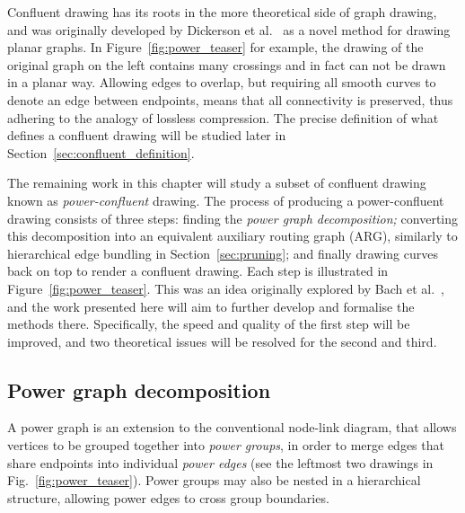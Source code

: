 Confluent drawing has its roots in the more theoretical side of graph drawing, and was originally developed by Dickerson et al.\ \cite{Dickerson2005} as a novel method for drawing planar graphs. In Figure~\ref{fig:power_teaser} for example, the drawing of the original graph on the left contains many crossings and in fact can not be drawn in a planar way. Allowing edges to overlap, but requiring all smooth curves to denote an edge between endpoints, means that all connectivity is preserved, thus adhering to the analogy of lossless compression.
The precise definition of what defines a confluent drawing will be studied later in Section~\ref{sec:confluent_definition}.

The remaining work in this chapter will study a subset of confluent drawing known as \emph{power-confluent} drawing.
The process of producing a power-confluent drawing consists of three steps: finding the \emph{power graph decomposition;} converting this decomposition into an equivalent auxiliary routing graph (ARG), similarly to hierarchical edge bundling in Section~\ref{sec:pruning}; and finally drawing curves back on top to render a confluent drawing. Each step is illustrated in Figure~\ref{fig:power_teaser}. This was an idea originally explored by Bach et al.\ \cite{Bach2017}, and the work presented here will aim to further develop and formalise the methods there.
Specifically, the speed and quality of the first step will be improved, and two theoretical issues will be resolved for the second and third.

\subsection{Power graph decomposition}
\label{sec:power_graph}
A power graph is an extension to the conventional node-link diagram, that allows vertices to be grouped together into \emph{power groups}, in order to merge edges that share endpoints into individual \emph{power edges} (see the leftmost two drawings in Fig.~\ref{fig:power_teaser}). Power groups may also be nested in a hierarchical structure, allowing power edges to cross group boundaries.

